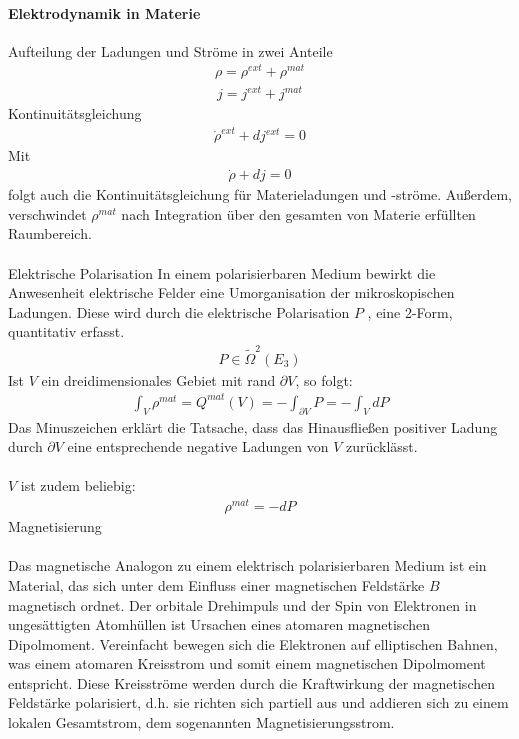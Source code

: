 \documentclass[10pt,a4paper]{article}
\begin{document}
\paragraph{Elektrodynamik in Materie} $\,$ \\
Aufteilung der Ladungen und Ströme in zwei Anteile
\begin{align}
\rho= \rho^{ext}+\rho^{mat}
\end{align}
\begin{align}
j=j^{ext}+j^{mat}
\end{align}
Kontinuitätsgleichung
\begin{align}
\dot{\rho}^{ext} + dj^{ext}=0
\end{align}
Mit
\begin{align}
\dot{\rho} +dj=0
\end{align}
folgt auch die Kontinuitätsgleichung für Materieladungen und -ströme.
Außerdem, verschwindet $\rho^{mat}$ nach Integration über den gesamten von Materie erfüllten Raumbereich.\\
\\
Elektrische Polarisation
In einem polarisierbaren Medium bewirkt die Anwesenheit elektrische Felder eine Umorganisation der mikroskopischen Ladungen.
Diese wird durch die elektrische Polarisation $P$ , eine 2-Form, quantitativ erfasst.
\begin{align}
P \in \tilde{\Omega}^2 (E_3)
\end{align}
Ist $V$ ein dreidimensionales Gebiet mit rand $ \partial V$, so folgt:
\begin{align}
\int_V \rho^{mat}= Q^{mat} (V) = -\int_{\partial V} P =- \int_V dP
\end{align}
Das Minuszeichen erklärt die Tatsache, dass das Hinausfließen positiver Ladung durch $ \partial V$ eine entsprechende negative Ladungen von $V$ zurücklässt.\\
\\
$V$ ist zudem beliebig:
\begin{align}
\rho^{mat}= -dP
\end{align}
Magnetisierung\\
\\
Das magnetische Analogon zu einem elektrisch polarisierbaren Medium ist ein Material, das sich unter dem Einfluss einer magnetischen Feldstärke $B$ magnetisch ordnet. Der orbitale Drehimpuls und der Spin von Elektronen in ungesättigten Atomhüllen ist Ursachen eines atomaren magnetischen Dipolmoment. Vereinfacht bewegen sich die Elektronen auf elliptischen Bahnen, was einem atomaren Kreisstrom und somit einem magnetischen Dipolmoment entspricht. Diese Kreisströme werden durch die Kraftwirkung der magnetischen Feldstärke polarisiert, d.h. sie richten sich partiell aus und addieren sich zu einem lokalen Gesamtstrom, dem sogenannten Magnetisierungsstrom.
\end{document}
